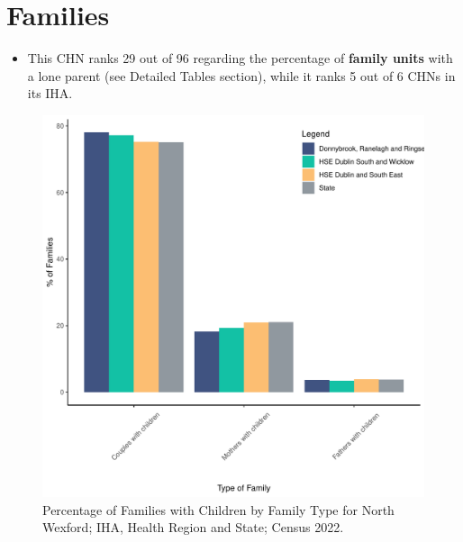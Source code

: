 \documentclass{article}
\begin{document}
\section{Families}\label{sect:Fam}
\begin{itemize}
\item This CHN ranks  29 out of 96 regarding the percentage of \textbf{family units} with a lone parent (see Detailed Tables section), while it ranks   5 out of 6 CHNs in its IHA.
\end{itemize}
\begin{figure}[H]
	\centering
	\includegraphics[width = 150mm]{../figures/FamED.pdf}
	\caption{Percentage of Families with Children by Family Type for North Wexford; IHA, Health Region and State; Census 2022.}
	\label{fig:vbnv}
	\end{figure}
	
\end{document}
